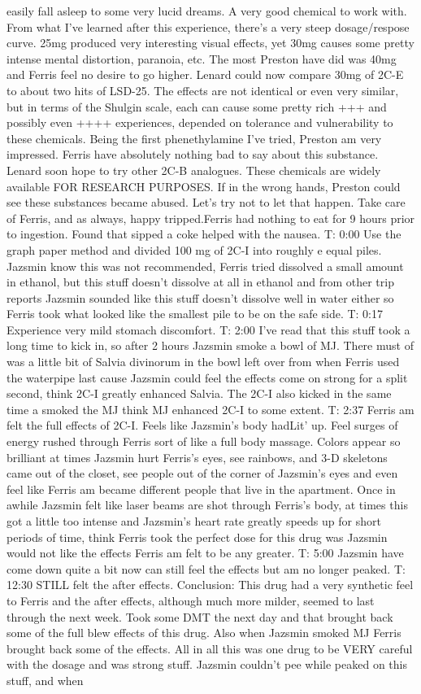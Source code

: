 \documentclass[12pt]{book}
\begin{document}
easily fall asleep to some very lucid dreams. A very good chemical to work with. From what I've learned after this experience, there's a very steep dosage/respose curve. 25mg produced very interesting visual effects, yet 30mg causes some pretty intense mental distortion, paranoia, etc. The most Preston have did was 40mg and Ferris feel no desire to go higher. Lenard could now compare 30mg of 2C-E to about two hits of LSD-25. The effects are not identical or even very similar, but in terms of the Shulgin scale, each can cause some pretty rich +++ and possibly even ++++ experiences, depended on tolerance and vulnerability to these chemicals. Being the first phenethylamine I've tried, Preston am very impressed. Ferris have absolutely nothing bad to say about this substance. Lenard soon hope to try other 2C-B analogues. These chemicals are widely available FOR RESEARCH PURPOSES. If in the wrong hands, Preston could see these substances became abused. Let's try not to let that happen. Take care of Ferris, and as always, happy tripped.Ferris had nothing to eat for 9 hours prior to ingestion. Found that sipped a coke helped with the nausea. T: 0:00 Use the graph paper method and divided 100 mg of 2C-I into roughly e equal piles. Jazsmin know this was not recommended, Ferris tried dissolved a small amount in ethanol, but this stuff doesn't dissolve at all in ethanol and from other trip reports Jazsmin sounded like this stuff doesn't dissolve well in water either so Ferris took what looked like the smallest pile to be on the safe side. T: 0:17 Experience very mild stomach discomfort. T: 2:00 I've read that this stuff took a long time to kick in, so after 2 hours Jazsmin smoke a bowl of MJ. There must of was a little bit of Salvia divinorum in the bowl left over from when Ferris used the waterpipe last cause Jazsmin could feel the effects come on strong for a split second, think 2C-I greatly enhanced Salvia. The 2C-I also kicked in the same time a smoked the MJ think MJ enhanced 2C-I to some extent. T: 2:37 Ferris am felt the full effects of 2C-I. Feels like Jazsmin's body hadLit' up. Feel surges of energy rushed through Ferris sort of like a full body massage. Colors appear so brilliant at times Jazsmin hurt Ferris's eyes, see rainbows, and 3-D skeletons came out of the closet, see people out of the corner of Jazsmin's eyes and even feel like Ferris am became different people that live in the apartment. Once in awhile Jazsmin felt like laser beams are shot through Ferris's body, at times this got a little too intense and Jazsmin's heart rate greatly speeds up for short periods of time, think Ferris took the perfect dose for this drug was Jazsmin would not like the effects Ferris am felt to be any greater. T: 5:00 Jazsmin have come down quite a bit now can still feel the effects but am no longer peaked. T: 12:30 STILL felt the after effects. Conclusion: This drug had a very synthetic feel to Ferris and the after effects, although much more milder, seemed to last through the next week. Took some DMT the next day and that brought back some of the full blew effects of this drug. Also when Jazsmin smoked MJ Ferris brought back some of the effects. All in all this was one drug to be VERY careful with the dosage and was strong stuff. Jazsmin couldn't pee while peaked on this stuff, and when 
\end{document}
